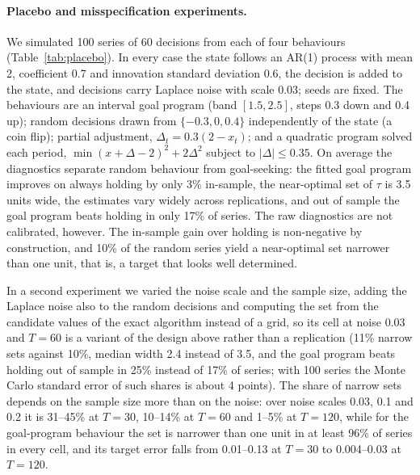 \documentclass[11pt,a4paper]{article}
\theoremstyle{remark}\newtheorem{remark}{Remark}
\begin{document}
\paragraph{Placebo and misspecification experiments.} We simulated 100 series of 60 decisions from each of four behaviours (Table~\ref{tab:placebo}). In every case the state follows an AR(1) process with mean 2, coefficient 0.7 and innovation standard deviation 0.6, the decision is added to the state, and decisions carry Laplace noise with scale 0.03; seeds are fixed. The behaviours are an interval goal program (band $[1.5,2.5]$, steps 0.3 down and 0.4 up); random decisions drawn from $\{-0.3,0,0.4\}$ independently of the state (a coin flip); partial adjustment, $\Delta_t=0.3(2-x_t)$; and a quadratic program solved each period, $\min(x+\Delta-2)^2+2\Delta^2$ subject to $|\Delta|\le0.35$. On average the diagnostics separate random behaviour from goal-seeking: the fitted goal program improves on always holding by only 3\% in-sample, the near-optimal set of $\tau$ is 3.5 units wide, the estimates vary widely across replications, and out of sample the goal program beats holding in only 17\% of series. The raw diagnostics are not calibrated, however. The in-sample gain over holding is non-negative by construction, and 10\% of the random series yield a near-optimal set narrower than one unit, that is, a target that looks well determined.

In a second experiment we varied the noise scale and the sample size, adding the Laplace noise also to the random decisions and computing the set from the candidate values of the exact algorithm instead of a grid, so its cell at noise 0.03 and $T=60$ is a variant of the design above rather than a replication (11\% narrow sets against 10\%, median width 2.4 instead of 3.5, and the goal program beats holding out of sample in 25\% instead of 17\% of series; with 100 series the Monte Carlo standard error of such shares is about 4 points). The share of narrow sets depends on the sample size more than on the noise: over noise scales 0.03, 0.1 and 0.2 it is 31--45\% at $T=30$, 10--14\% at $T=60$ and 1--5\% at $T=120$, while for the goal-program behaviour the set is narrower than one unit in at least 96\% of series in every cell, and its target error falls from 0.01--0.13 at $T=30$ to 0.004--0.03 at $T=120$.
\end{document}
